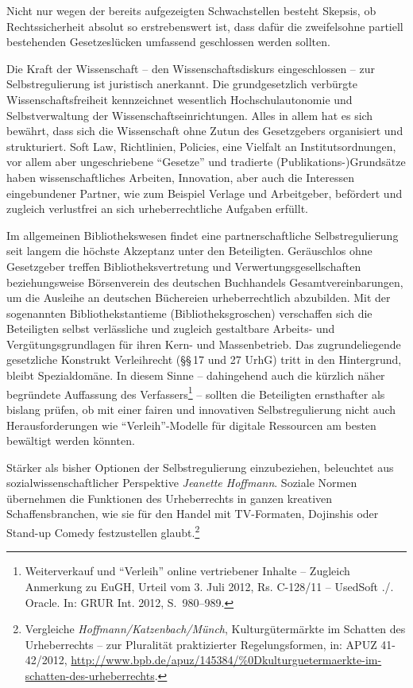 \documentclass[output=paper]{langscibook}
\begin{document}
Nicht nur wegen der bereits aufgezeigten Schwachstellen besteht Skepsis,
ob Rechtssicherheit absolut so erstrebenswert ist, dass dafür die
zweifelsohne partiell bestehenden Gesetzeslücken umfassend geschlossen
werden sollten.

Die Kraft der Wissenschaft -- den Wissenschaftsdiskurs eingeschlossen --
zur Selbstregulierung ist juristisch anerkannt. Die grundgesetzlich
verbürgte Wissenschaftsfreiheit kennzeichnet wesentlich
Hochschulautonomie und Selbstverwaltung der Wissenschaftseinrichtungen.
Alles in allem hat es sich bewährt, dass sich die Wissenschaft ohne
Zutun des Gesetzgebers organisiert und strukturiert. Soft Law,
Richtlinien, Policies, eine Vielfalt an Institutsordnungen, vor allem
aber ungeschriebene \enquote{Gesetze} und tradierte
(Publikations-)Grundsätze haben wissenschaftliches Arbeiten, Innovation,
aber auch die Interessen eingebundener Partner, wie zum Beispiel Verlage
und Arbeitgeber, befördert und zugleich verlustfrei an sich
urheberrechtliche Aufgaben erfüllt.

Im allgemeinen Bibliothekswesen findet eine partnerschaftliche
Selbstregulierung seit langem die höchste Akzeptanz unter den
Beteiligten. Geräuschlos ohne Gesetzgeber treffen Bibliotheksvertretung
und Verwertungsgesellschaften beziehungsweise Börsenverein des deutschen
Buchhandels Gesamtvereinbarungen, um die Ausleihe an deutschen
Büchereien urheberrechtlich abzubilden. Mit der sogenannten
Bibliothekstantieme (Bibliotheksgroschen) verschaffen sich die
Beteiligten selbst verlässliche und zugleich gestaltbare Arbeits- und
Vergütungsgrundlagen für ihren Kern- und Massenbetrieb. Das
zugrundeliegende gesetzliche Konstrukt Verleihrecht (§§\,17 und 27 UrhG)
tritt in den Hintergrund, bleibt Spezialdomäne. In diesem Sinne --
dahingehend auch die kürzlich näher begründete Auffassung des
Verfassers\footnote{Weiterverkauf und \enquote{Verleih} online
  vertriebener Inhalte -- Zugleich Anmerkung zu EuGH, Urteil vom 3. Juli
  2012, Rs. C-128/11 -- UsedSoft ./. Oracle. In: GRUR Int. 2012, S.~980--989.} -- sollten die Beteiligten ernsthafter als bislang prüfen,
ob mit einer fairen und innovativen Selbstregulierung nicht auch
Herausforderungen wie \enquote{Verleih}-Modelle für digitale Ressourcen
am besten bewältigt werden könnten.

Stärker als bisher Optionen der Selbstregulierung einzubeziehen,
beleuchtet aus sozialwissenschaftlicher Perspektive \emph{Jeanette
Hoffmann}. Soziale Normen übernehmen die Funktionen des Urheberrechts in
ganzen kreativen Schaffensbranchen, wie sie für den Handel mit
TV-Formaten, Dojinshis oder Stand-up Comedy festzustellen
glaubt.\footnote{Vergleiche \emph{Hoffmann/Katzenbach/Münch},
  Kulturgütermärkte im Schatten des Urheberrechts -- zur Pluralität
  praktizierter Regelungsformen, in: APUZ 41-42/2012,
  \url{http://www.bpb.de/apuz/145384/\%0Dkulturguetermaerkte-im-schatten-des-urheberrechts}.}
\end{document}
